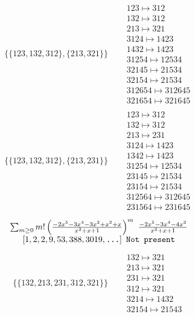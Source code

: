 \begin{tiny}
\begin{align}
\begin{matrix}
\end{matrix}
\\
\{\{123, 132, 312\}, \{213, 321\}\}
\quad
&
\begin{matrix}
123 \mapsto 312\\132 \mapsto 312\\213 \mapsto 321\\3124 \mapsto 1423\\1432 \mapsto 1423\\31254 \mapsto 12534\\32145 \mapsto 21534\\32154 \mapsto 21534\\312654 \mapsto 312645\\321654 \mapsto 321645
\end{matrix}
\\
\{\{123, 132, 312\}, \{213, 231\}\}
\quad
&
\begin{matrix}
123 \mapsto 312\\132 \mapsto 312\\213 \mapsto 231\\3124 \mapsto 1423\\1342 \mapsto 1423\\31254 \mapsto 12534\\23145 \mapsto 21534\\23154 \mapsto 21534\\312564 \mapsto 312645\\231564 \mapsto 231645
\end{matrix}
\end{align}
$$
\begin{matrix}
\sum_{m \geq 0} m! \left(
\frac{-2 x^{5} - 3 x^{4} - 3 x^{3} + x^{2} + x}{x^{2} + x + 1}
\right)^m
\ 
\frac{-2 x^{5} - 3 x^{4} - 4 x^{3}}{x^{2} + x + 1}
\\
\left[1, 2, 2, 9, 53, 388, 3019, \text{\texttt{...}}\right]
\ 
\texttt{Not present}
\end{matrix}
$$
\vspace{-1em}
\begin{align}
\{\{132, 213, 231, 312, 321\}\}
\quad
&
\begin{matrix}
132 \mapsto 321\\213 \mapsto 321\\231 \mapsto 321\\312 \mapsto 321\\3214 \mapsto 1432\\32154 \mapsto 21543
\end{matrix}
\\

\end{align}
\end{tiny}
